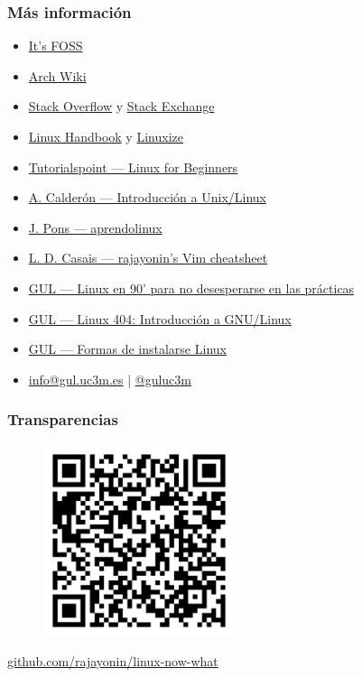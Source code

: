 \documentclass[aspectratio=43]{beamer}
\begin{document}
\begin{frame}
    \frametitle{Más información}

    \begin{itemize}
        \item \href{https://itsfoss.com/}{It's FOSS}
        \item \href{https://wiki.archlinux.org/}{Arch Wiki}
        \item \href{https://stackoverflow.com/}{Stack Overflow} y \href{https://stackoverflow.com/}{Stack Exchange}
        \item \href{https://stackoverflow.com/}{Linux Handbook} y \href{https://linuxize.com/}{Linuxize}
        \item \href{https://www.tutorialspoint.com/unix/index.htm}{Tutorialspoint — Linux for Beginners}
        \item \href{https://github.com/acaldero/uc3m_linux}{A. Calderón — Introducción a Unix/Linux}
        \item \href{https://aprendolinux.com}{J. Pons — aprendolinux}
        \item \href{https://github.com/rajayonin/cheatsheets/blob/main/vim_cheatsheet.md}{L. D. Casais — rajayonin's Vim cheatsheet}
        \item \href{https://youtu.be/2qZBUa93MQ8}{GUL — Linux en 90' para no desesperarse en las prácticas}
        \item \href{https://cloud-gul.uc3m.es/s/4qXKozr7DmDSZiN}{GUL — Linux 404: Introducción a GNU/Linux}
        \item \href{https://github.com/guluc3m/linux404/blob/main/README.md}{GUL — Formas de instalarse Linux}
        \item \href{mailto:info@gul.uc3m.es}{info@gul.uc3m.es} | \href{https://twitter.com/guluc3m}{@guluc3m}
    \end{itemize}

\end{frame}


\begin{frame}
    \frametitle{Transparencias}
    \centering
    
    \begin{figure}
        \includegraphics[width=0.5\textwidth]{img/qr-code.png}
    \end{figure}

    \href{https://github.com/rajayonin/linux-now-what}{github.com/rajayonin/linux-now-what}

\end{frame}
\end{document}
